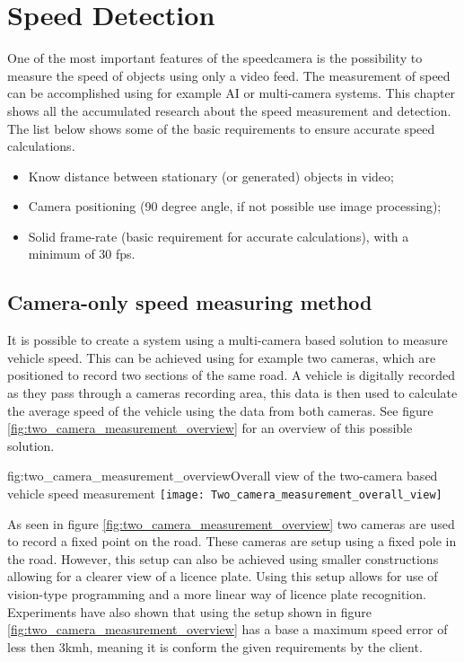 \chapter{Speed Detection}
\label{chap:speed-detection}

One of the most important features of the speedcamera is the possibility to measure the speed of objects using only a video feed. The measurement of 
speed can be accomplished using for example AI or multi-camera systems. This chapter shows all the accumulated research about the speed measurement 
and detection. The list below shows some of the basic requirements to ensure accurate speed calculations.

\begin{itemize}
    \item Know distance between stationary (or generated) objects in video;
    \item Camera positioning (90 degree angle, if not possible use image processing);
    \item Solid frame-rate (basic requirement for accurate calculations), with a minimum of 30 fps.
\end{itemize}

\section{Camera-only speed measuring method}
It is possible to create a system using a multi-camera based solution to measure vehicle speed. This can be achieved using for example two cameras,
which are positioned to record two sections of the same road. A vehicle is digitally recorded as they pass through a cameras recording area, this data
is then used to calculate the average speed of the vehicle using the data from both cameras. See figure \ref{fig:two_camera_measurement_overview} for 
an overview of this possible solution.

\begin{linfigure}{fig:two_camera_measurement_overview}{Overall view of the two-camera based vehicle speed measurement}
    \texttt{[image: Two\_camera\_measurement\_overall\_view]}
\end{linfigure}

As seen in figure \ref{fig:two_camera_measurement_overview} two cameras are used to record a fixed point on the road. These cameras are setup using a
fixed pole in the road. However, this setup can also be achieved using smaller constructions allowing for a clearer view of a licence plate. Using 
this setup allows for use of vision-type programming and a more linear way of licence plate recognition. Experiments have also shown that using the 
setup shown in figure \ref{fig:two_camera_measurement_overview} has a base a maximum speed error of less then 3kmh, meaning it is conform the given
requirements by the client. 

